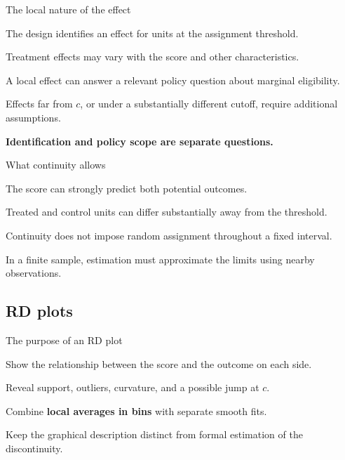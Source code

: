 \begin{frame}{The local nature of the effect}
\begin{items}
\item The design identifies an effect for units at the assignment threshold.
\item Treatment effects may vary with the score and other characteristics.
\item A local effect can answer a relevant policy question about marginal eligibility.
\item Effects far from $c$, or under a substantially different cutoff, require additional assumptions.
\end{items}
\vspace{.5em}
\textbf{Identification and policy scope are separate questions.}
\end{frame}

\begin{frame}{What continuity allows}
\begin{items}
\item The score can strongly predict both potential outcomes.
\item Treated and control units can differ substantially away from the threshold.
\item Continuity does not impose random assignment throughout a fixed interval.
\item In a finite sample, estimation must approximate the limits using nearby observations.
\end{items}
\end{frame}

\subsection{RD plots}
\begin{frame}{The purpose of an RD plot}
\begin{items}
\item Show the relationship between the score and the outcome on each side.
\item Reveal support, outliers, curvature, and a possible jump at $c$.
\item Combine \textbf{local averages in bins} with separate smooth fits.
\item Keep the graphical description distinct from formal estimation of the discontinuity.
\end{items}
\end{frame}

